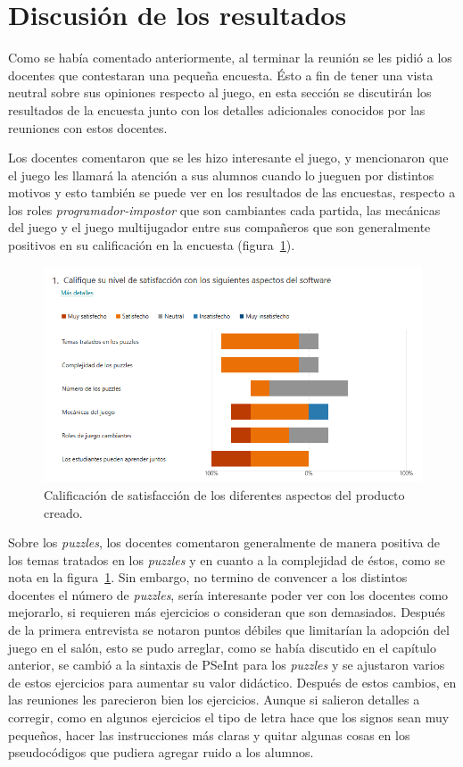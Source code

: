\section{Discusión de los resultados}
Como se había comentado anteriormente, al terminar la reunión se les pidió a los docentes que contestaran una pequeña encuesta. Ésto a fin de tener una vista neutral sobre sus opiniones respecto al juego, en esta sección se discutirán los resultados de la encuesta junto con los detalles adicionales conocidos por las reuniones con estos docentes. 

Los docentes comentaron que se les hizo interesante el juego, y mencionaron que el juego les llamará la atención a sus alumnos cuando lo jueguen por distintos motivos y esto también se puede ver en los resultados de las encuestas, respecto a los roles \textit{programador-impostor} que son cambiantes cada partida, las mecánicas del juego y el juego multijugador entre sus compañeros que son generalmente positivos en su calificación en la encuesta (figura~\ref{fig:calif_software}).

\begin{figure}[H]
    \centering
    \includegraphics[width=0.8\linewidth]{images/Resencuesta (3).png}
    \caption{Calificación de satisfacción de los diferentes aspectos del producto creado.}
    \label{fig:calif_software}
\end{figure}

Sobre los \textit{puzzles}, los docentes comentaron generalmente de manera positiva de los temas tratados en los \textit{puzzles} y en cuanto a la complejidad de éstos, como se nota en la figura~\ref{fig:calif_software}. Sin embargo, no termino de convencer a los distintos docentes el número de \textit{puzzles}, sería interesante poder ver con los docentes como mejorarlo, si requieren más ejercicios o consideran que son demasiados. Después de la primera entrevista se notaron puntos débiles que limitarían la adopción del juego en el salón, esto se pudo arreglar, como se había discutido en el capítulo anterior, se cambió a la sintaxis de PSeInt para los \textit{puzzles} y se ajustaron varios de estos ejercicios para aumentar su valor didáctico. Después de estos cambios, en las reuniones les parecieron bien los ejercicios. Aunque si salieron detalles a corregir, como en algunos ejercicios el tipo de letra hace que los signos sean muy pequeños, hacer las instrucciones más claras y quitar algunas cosas en los pseudocódigos que pudiera agregar ruido a los alumnos.

